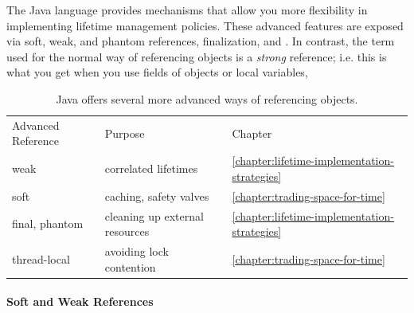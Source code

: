 
The Java language provides mechanisms that allow you more flexibility in
implementing lifetime management policies. These advanced features are exposed
via soft, weak, and phantom references, finalization, and \tls. In contrast, the
term used for the normal way of referencing objects is a \emph{strong}
reference; i.e. this is what you get when you use
fields of objects or local variables,


\begin{table}
\centering
	\begin{tabular}{lll}
	\toprule
	Advanced Reference & Purpose                & Chapter \\
	\cmidrule(r){1-1} \cmidrule(r){2-2} \cmidrule(l){3-3}
    weak           & correlated lifetimes           & \autoref{chapter:lifetime-implementation-strategies}  \\
    soft           & caching, safety valves & \autoref{chapter:trading-space-for-time} \\
    final, phantom & cleaning up external resources & \autoref{chapter:lifetime-implementation-strategies} \\
    thread-local   & avoiding lock contention & \autoref{chapter:trading-space-for-time} \\ 
	\bottomrule
	\end{tabular}
	\caption{Java offers several more advanced ways of referencing objects.}
\end{table}

\paragraph{Soft and Weak References}

